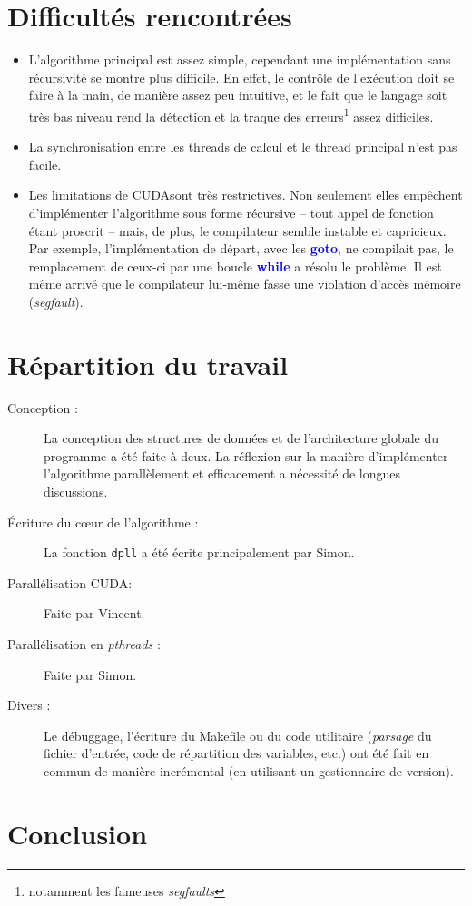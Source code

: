 \documentclass{article}
\newcommand{\keyword}[1]{\textbf{\textcolor{blue}{#1}}}
\newcommand{\code}[1]{\texttt{{#1}}}
\newcommand{\cuda}{\textsc{CUDA}}
\begin{document}
\section{Difficultés rencontrées}
\begin{itemize}
    \item L'algorithme principal est assez simple, cependant une implémentation sans récursivité se montre plus difficile. En effet, le contrôle de l'exécution doit se faire à la main, de manière assez peu intuitive, et le fait que le langage soit très bas niveau rend la détection et la traque des erreurs\footnote{notamment les fameuses \emph{segfaults}} assez difficiles.
    \item La synchronisation entre les threads de calcul et le thread principal n'est pas facile.
    \item Les limitations de \cuda sont très restrictives. Non seulement elles empêchent d'implémenter l'algorithme sous forme récursive -- tout appel de fonction étant proscrit -- mais, de plus, le compilateur semble instable et capricieux. Par exemple, l'implémentation de départ, avec les \keyword{goto}, ne compilait pas, le remplacement de ceux-ci par une boucle \keyword{while} a résolu le problème. Il est même arrivé que le compilateur lui-même fasse une violation d'accès mémoire (\emph{segfault}).
\end{itemize}

\section{Répartition du travail}
\begin{description}
    \item[Conception :] La conception des structures de données et de l'architecture globale du programme a été faite à deux. La réflexion sur la manière d'implémenter l'algorithme parallèlement et efficacement a nécessité de longues discussions.
    \item[Écriture du cœur de l'algorithme :] La fonction \code{dpll} a été écrite principalement par Simon.
    \item[Parallélisation \cuda :] Faite par Vincent.
    \item[Parallélisation en \emph{pthreads} :] Faite par Simon.
    \item[Divers :] Le débuggage, l'écriture du Makefile ou du code utilitaire (\emph{parsage} du fichier d'entrée, code de répartition des variables, etc.) ont été fait en commun de manière incrémental (en utilisant un gestionnaire de version).
\end{description}


\section{Conclusion}
\end{document}
